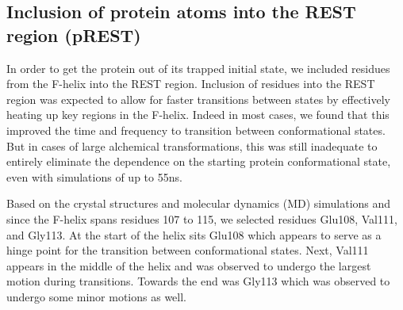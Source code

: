 \documentclass{article}
\begin{document}
\subsection*{Inclusion of protein atoms into the REST region (pREST)}
In order to get the protein out of its trapped initial state, we included residues from the F-helix into the REST region.
Inclusion of residues into the REST region was expected to allow for faster transitions between states by effectively heating up key regions in the F-helix.
Indeed in most cases, we found that this improved the time and frequency to transition between conformational states.
But in cases of large alchemical transformations, this was still inadequate to entirely eliminate the dependence on the starting protein conformational state, even with simulations of up to 55ns.

Based on the crystal structures and molecular dynamics (MD) simulations and since the F-helix spans residues 107 to 115, we selected residues Glu108, Val111, and Gly113.
At the start of the helix sits Glu108 which appears to serve as a hinge point for the transition between conformational states. 
Next, Val111 appears in the middle of the helix and was observed to undergo the largest motion during transitions. 
Towards the end was Gly113 which was observed to undergo some minor motions as well.
\end{document}
